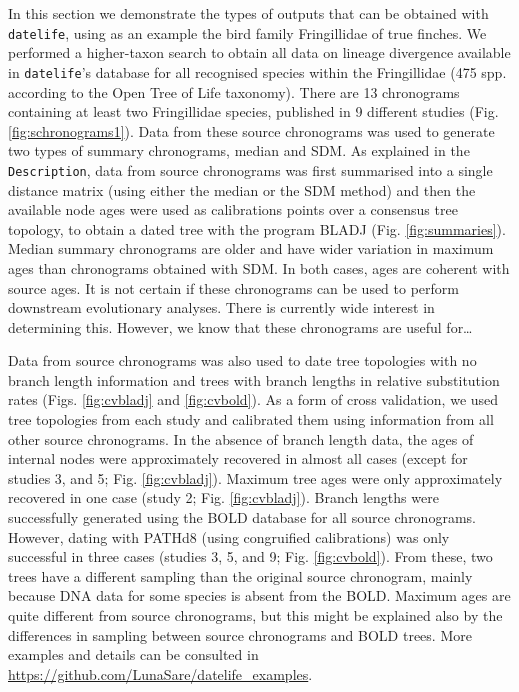 \documentclass[]{article}
\begin{document}
In this section we demonstrate the types of outputs that can be obtained with \texttt{datelife}, using as an example the bird family Fringillidae of true finches. We performed a higher-taxon search to obtain all data on lineage divergence available in \texttt{datelife}'s database for all recognised species within the Fringillidae (475 spp. according to the Open Tree of Life taxonomy). There are 13 chronograms containing at least two Fringillidae species, published in 9 different studies (Fig. \ref{fig:schronograms1}).
Data from these source chronograms was used to generate two types of summary chronograms, median and SDM. As explained in the \texttt{Description}, data from source chronograms was first summarised into a single distance matrix (using either the median or the SDM method) and then the available node ages were used as calibrations points over a consensus tree topology, to obtain a dated tree with the program BLADJ (Fig. \ref{fig:summaries}). Median summary chronograms are older and have wider variation in maximum ages than chronograms obtained with SDM. In both cases, ages are coherent with source ages.
It is not certain if these chronograms can be used to perform downstream evolutionary analyses. There is currently wide interest in determining this. However, we know that these chronograms are useful for\ldots{}

Data from source chronograms was also used to date tree topologies with no branch length information and trees with branch lengths in relative substitution rates (Figs. \ref{fig:cvbladj} and \ref{fig:cvbold}). As a form of cross validation, we used tree topologies from each study and calibrated them using information from all other source chronograms. In the absence of branch length data, the ages of internal nodes were approximately recovered in almost all cases (except for studies 3, and 5; Fig. \ref{fig:cvbladj}). Maximum tree ages were only approximately recovered in one case (study 2; Fig. \ref{fig:cvbladj}).
Branch lengths were successfully generated using the BOLD database for all source chronograms. However, dating with PATHd8 (using congruified calibrations) was only successful in
three cases (studies 3, 5, and 9; Fig. \ref{fig:cvbold}). From these, two trees have a different sampling than the original source chronogram, mainly because DNA data for some species is absent from the BOLD. Maximum ages are quite different from source chronograms, but this might be explained also by the differences in sampling between source chronograms and BOLD trees.
More examples and details can be consulted in \url{https://github.com/LunaSare/datelife_examples}.
\end{document}
